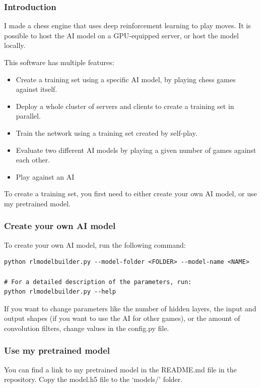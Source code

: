 \documentclass{article}
\begin{document}
\subsubsection{Introduction}

I made a chess engine that uses deep reinforcement learning to 
play moves. It is possible to host the AI model on a GPU-equipped server, or
host the model locally.

This software has multiple features:

\begin{itemize}
	\item Create a training set using a specific AI model, by playing chess games against itself.
	\item Deploy a whole cluster of servers and clients to create a training set in parallel.
	\item Train the network using a training set created by self-play.
	\item Evaluate two different AI models by playing a given number of games against each other.
	\item Play against an AI
\end{itemize}


To create a training set, you first need to either create your own AI model, or use my pretrained model.

\subsubsection{Create your own AI model}

To create your own AI model, run the following command:

\begin{verbatim}
python rlmodelbuilder.py --model-folder <FOLDER> --model-name <NAME> 

# For a detailed description of the parameters, run:
python rlmodelbuilder.py --help
\end{verbatim}

If you want to change parameters like the number of hidden layers, 
the input and output shapes (if you want to use the AI for other games), or the amount of convolution filters, 
change values in the config.py file.

\subsubsection{Use my pretrained model}

You can find a link to my pretrained model in the README.md file in the repository.
Copy the model.h5 file to the `models/' folder.
\end{document}
